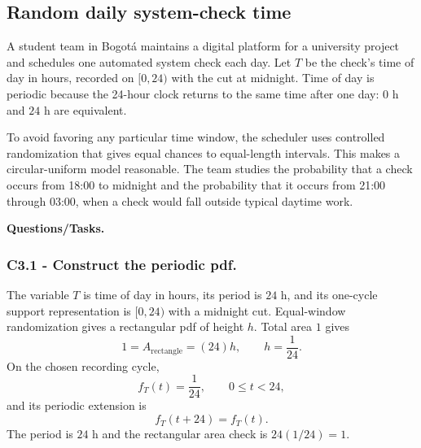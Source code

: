 	\subsection{Random daily system-check time}\label{sec:c3-uniform-check}
	A student team in Bogot\'a maintains a digital platform for a university
	project and schedules one automated system check each day.  Let $T$ be the
	check's time of day in hours, recorded on $[0,24)$ with the cut at midnight.
	Time of day is periodic because the 24-hour clock returns to the same time
	after one day: $0$ h and $24$ h are equivalent.
	
	To avoid favoring any particular time window, the scheduler uses controlled
	randomization that gives equal chances to equal-length intervals.  This makes
	a circular-uniform model reasonable.  The team studies the probability that
	a check occurs from 18:00 to midnight and the probability that it occurs from
	21:00 through 03:00, when a check would fall outside typical daytime work.
	
	\begingroup
	\endgroup
	
	\textbf{Questions/Tasks.}
	\begin{enumerate}
	\end{enumerate}
	
	\subsubsection*{C3.1 - Construct the periodic pdf.}
	\label{subsec:c3-uniform-check-a}
	The variable $T$ is time of day in hours, its period is $24$ h, and its
	one-cycle support representation is $[0,24)$ with a midnight cut.
	Equal-window randomization gives a
	rectangular pdf of height $h$.  Total area $1$ gives
	\[
	1=A_{\text{rectangle}}=(24)h,\qquad h=\frac1{24}.
	\]
	On the chosen recording cycle,
	\[
	f_T(t)=\frac1{24},\qquad 0\le t<24,
	\]
	and its periodic extension is
	\[
	f_T(t+24)=f_T(t).
	\]
	The period is $24$ h and the rectangular area check is $24(1/24)=1$.
	
